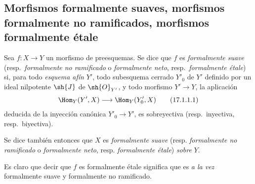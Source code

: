 \subsection{Morfismos formalmente suaves, morfismos formalmente no ramificados, morfismos formalmente étale}
\label{subsection:IV.17.1}

\begin{definition}[17.1.1]
\label{IV.17.1.1}
Sea $f:X\to Y$ un morfismo de preesquemas. Se dice que $f$ es \emph{formalmente suave} \textup{(resp.}\ \emph{formalmente no ramificado} o \emph{formalmente neto}, \textup{resp.}\ \emph{formalmente étale}\textup{)} si, para todo \emph{esquema afín} $Y'$, todo subesquema cerrado $Y'_0$ de $Y'$ definido por un ideal nilpotente $\sh{J}$ de $\sh{O}_{Y'}$, y todo morfismo $Y'\to Y$, la aplicación
\[
\label{IV.17.1.1.1}
  \Hom_Y(Y',X)\longrightarrow\Hom_Y(Y'_0,X)
  \tag{17.1.1.1}
\]
deducida de la inyección canónica $Y'_0\to Y'$, es sobreyectiva \textup{(resp.}\ inyectiva, \textup{resp.}\ biyectiva\textup{)}.
\end{definition}

Se dice también entonces que $X$ es \emph{formalmente suave} (resp. \emph{formalmente no ramificado} o \emph{formalmente neto}, resp. \emph{formalmente étale}) \emph{sobre} $Y$.

Es claro que decir que $f$ es formalmente étale significa que es \emph{a la vez} formalmente suave y formalmente no ramificado.

